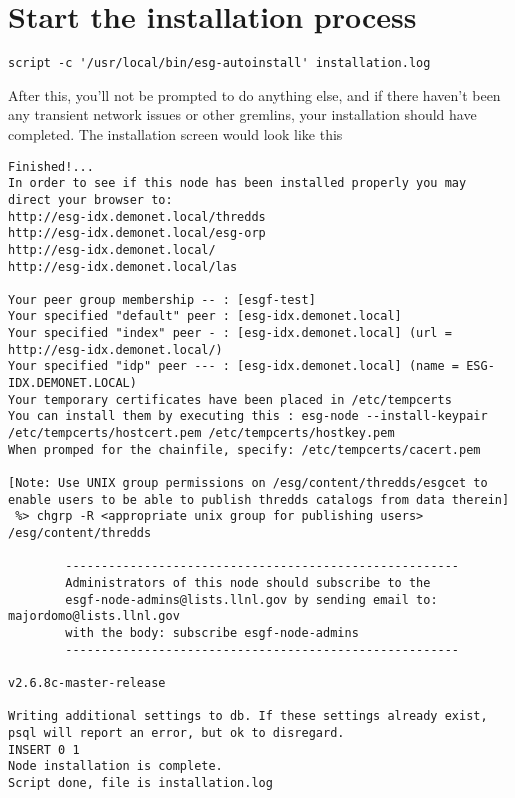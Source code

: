 \section{Start the installation
process}\label{start-the-installation-process}

\begin{verbatim}
script -c '/usr/local/bin/esg-autoinstall' installation.log
\end{verbatim}

After this, you'll not be prompted to do anything else, and if there
haven't been any transient network issues or other gremlins, your
installation should have completed. The installation screen would look
like this

\begin{verbatim}
Finished!...
In order to see if this node has been installed properly you may direct your browser to:
http://esg-idx.demonet.local/thredds
http://esg-idx.demonet.local/esg-orp
http://esg-idx.demonet.local/
http://esg-idx.demonet.local/las

Your peer group membership -- : [esgf-test]
Your specified "default" peer : [esg-idx.demonet.local]
Your specified "index" peer - : [esg-idx.demonet.local] (url = http://esg-idx.demonet.local/)
Your specified "idp" peer --- : [esg-idx.demonet.local] (name = ESG-IDX.DEMONET.LOCAL)
Your temporary certificates have been placed in /etc/tempcerts
You can install them by executing this : esg-node --install-keypair /etc/tempcerts/hostcert.pem /etc/tempcerts/hostkey.pem
When promped for the chainfile, specify: /etc/tempcerts/cacert.pem

[Note: Use UNIX group permissions on /esg/content/thredds/esgcet to enable users to be able to publish thredds catalogs from data therein]
 %> chgrp -R <appropriate unix group for publishing users> /esg/content/thredds

        -------------------------------------------------------
        Administrators of this node should subscribe to the
        esgf-node-admins@lists.llnl.gov by sending email to: majordomo@lists.llnl.gov
        with the body: subscribe esgf-node-admins
        -------------------------------------------------------

v2.6.8c-master-release

Writing additional settings to db. If these settings already exist, psql will report an error, but ok to disregard.
INSERT 0 1
Node installation is complete.
Script done, file is installation.log
\end{verbatim}


